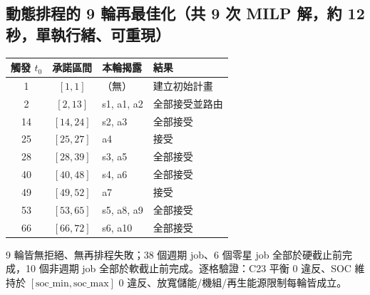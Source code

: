 \documentclass[12pt,a4paper,fontset=none]{ctexart}
\begin{document}
\subsection{動態排程的 9 輪再最佳化（共 9 次 MILP 解，約 12 秒，單執行緒、可重現）}
\begin{center}
\begin{tabularx}{\linewidth}{cclX}
\toprule
\textbf{觸發 $t_0$} & \textbf{承諾區間} & \textbf{本輪揭露} & \textbf{結果} \\
\midrule
1  & $[1,1]$   & （無）        & 建立初始計畫 \\
2  & $[2,13]$  & s1, a1, a2   & 全部接受並路由 \\
14 & $[14,24]$ & s2, a3       & 全部接受 \\
25 & $[25,27]$ & a4           & 接受 \\
28 & $[28,39]$ & s3, a5       & 全部接受 \\
40 & $[40,48]$ & s4, a6       & 全部接受 \\
49 & $[49,52]$ & a7           & 接受 \\
53 & $[53,65]$ & s5, a8, a9   & 全部接受 \\
66 & $[66,72]$ & s6, a10      & 全部接受 \\
\bottomrule
\end{tabularx}
\end{center}
9 輪皆無拒絕、無再排程失敗；38 個週期 job、6 個零星 job 全部於硬截止前完成，10 個非週期 job 全部於軟截止前完成。逐格驗證：C23 平衡 0 違反、SOC 維持於 $[\mathrm{soc\_min},\mathrm{soc\_max}]$ 0 違反、放寬儲能/機組/再生能源限制每輪皆成立。
\end{document}
